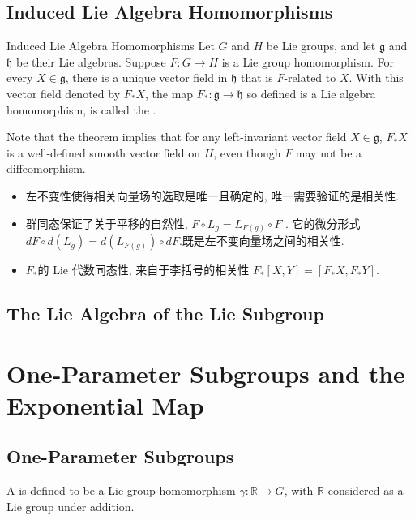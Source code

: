 \documentclass[../main.tex]{subfiles}
\begin{document}
\subsection*{Induced Lie Algebra Homomorphisms}
\begin{theorem}{Induced Lie Algebra Homomorphisms}{}
Let $G$ and $H$ be Lie groups, and let $\mathfrak g$ and $\mathfrak h$ be their Lie algebras. Suppose $F\colon G \to H$ is a Lie group homomorphism. For every $X \in \mathfrak g$, there is a unique vector field in $\mathfrak h$ that is $F$-related to $X$. With this vector field denoted by $F_* X$, the map $F_* \colon \mathfrak g \to \mathfrak h$ so defined is a Lie algebra homomorphism, is called the .
\end{theorem}
\begin{remark}
     Note that the theorem implies that for any left-invariant vector field \(X\in\mathfrak{g}\), \(F_{*}X\) is a well-defined smooth vector field on \(H\), even though \(F\) may not be a diffeomorphism.
\end{remark}
\begin{proofsketch}
 \begin{itemize}
    \item    左不变性使得相关向量场的选取是唯一且确定的, 唯一需要验证的是相关性.
    \item 
    群同态保证了关于平移的自然性, \(  F\circ L_{g}= L_{F\left( g \right) }\circ F  \) . 它的微分形式 \(
dF\circ d(L_{g})=d(L_{F(g)})\circ dF.
\)既是左不变向量场之间的相关性.
\item 
\(  F_{*}  \)的 Lie 代数同态性, 来自于李括号的相关性 \(  F_{*}\left[ X,Y \right]= \left[ F_{*}X, F_{*}Y \right]    \). 


 \end{itemize}
 
\end{proofsketch}

\subsection*{The Lie Algebra of the Lie Subgroup}



\section{One-Parameter Subgroups and the Exponential Map}

\subsection{ One-Parameter Subgroups}
\begin{definition}{}{}
    A  is defined to be a Lie group homomorphism \(\gamma \colon \mathbb{R} \to G\), with \(\mathbb{R}\) considered as a Lie group under addition.
\end{definition}
\end{document}
